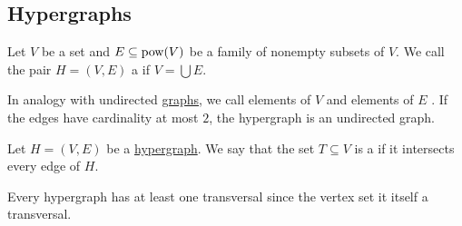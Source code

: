 \subsection{Hypergraphs}\label{subsec:hypergraphs}

\begin{definition}\label{def:hypergraph}
  Let \( V \) be a set and \( E \subseteq \operatorname{pow}(V) \) be a family of nonempty subsets of \( V \). We call the pair \( H = (V, E) \) a  if \( V = \bigcup E \).

  In analogy with undirected \hyperref[def:undirected_graph]{graphs}, we call elements of \( V \)  and elements of \( E \) . If the edges have cardinality at most \( 2 \), the hypergraph is an undirected graph.
\end{definition}

\begin{definition}\label{def:hypergraph_transversal}
  Let \( H = (V, E) \) be a \hyperref[def:hypergraph]{hypergraph}. We say that the set \( T \subseteq V \) is a  if it intersects every edge of \( H \).
\end{definition}

\begin{example}\label{ex:trivial_hypergraph_transversal}
  Every hypergraph has at least one transversal since the vertex set it itself a transversal.
\end{example}

